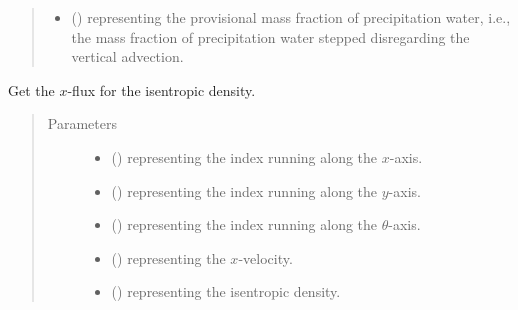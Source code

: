 \documentclass[letterpaper,10pt,english]{sphinxmanual}
\begin{document}
\begin{fulllineitems}
\begin{fulllineitems}
\begin{quote}
\begin{description}
\begin{itemize}
\item {} 
 () \textendash{}  representing the provisional mass fraction of precipitation water,
i.e., the mass fraction of precipitation water stepped disregarding the vertical advection.

\end{itemize}

\end{description}\end{quote}

\end{fulllineitems}


\begin{fulllineitems}
\label{\detokenize{api:tasmania.dycore.flux_isentropic_nonconservative_centered.FluxIsentropicNonconservativeCentered._get_centered_flux_x_s}}
Get the \(x\)-flux for the isentropic density.
\begin{quote}\begin{description}
\item[{Parameters}] \leavevmode\begin{itemize}
\item {} 
 () \textendash{}  representing the index running along the \(x\)-axis.

\item {} 
 () \textendash{}  representing the index running along the \(y\)-axis.

\item {} 
 () \textendash{}  representing the index running along the \(\theta\)-axis.

\item {} 
 () \textendash{}  representing the \(x\)-velocity.

\item {} 
 () \textendash{}  representing the isentropic density.


\end{itemize}
\end{description}
\end{quote}
\end{fulllineitems}
\end{fulllineitems}
\end{document}
